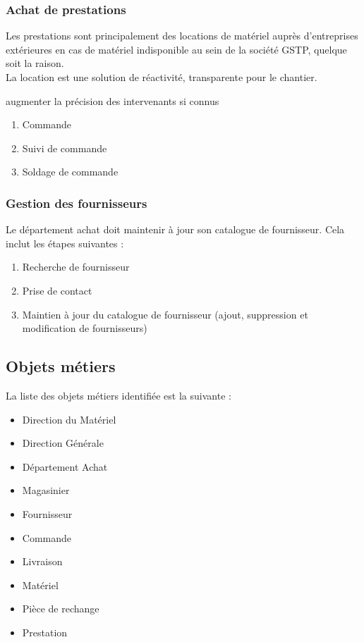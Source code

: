 \subsubsection{Achat de prestations}

Les prestations sont principalement des locations de matériel auprès d'entreprises extérieures 
en cas de matériel indisponible au sein de la société GSTP, quelque soit la
raison.\\
La location est une solution de réactivité, transparente pour le chantier.

augmenter la
précision des intervenants si connus

\begin{enumerate}
\item Commande 
\item Suivi de commande
\item Soldage de commande
\end{enumerate}


\subsubsection{Gestion des fournisseurs}

Le département achat doit maintenir à jour son catalogue de fournisseur.
Cela inclut les étapes suivantes :
\begin{enumerate}
\item Recherche de fournisseur
\item Prise de contact
\item Maintien à jour du catalogue de fournisseur (ajout, suppression et
modification de fournisseurs)
\end{enumerate}


\subsection{Objets métiers}

La liste des objets métiers identifiée est la suivante :

\begin{itemize}
\item Direction du Matériel
\item Direction Générale
\item Département Achat
\item Magasinier
\item Fournisseur
\item Commande
\item Livraison
\item Matériel
\item Pièce de rechange
\item Prestation
\end{itemize}


